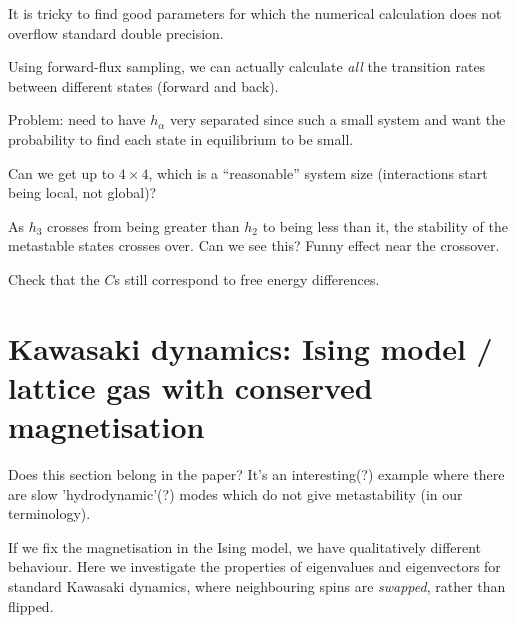 \documentclass[10pt]{article}
\newcommand{\zeros}{\mathbf{0}}
\newcommand{\comment}[1]{{\color{red}#1}}
\begin{document}

It is tricky to find good parameters for which the numerical calculation does
not overflow standard double precision.

Using forward-flux sampling, we can actually calculate \emph{all} the transition
rates
between different states (forward and back).

Problem: need to have $h_\alpha$ very separated since such a small system and
want the probability to find each state in equilibrium to be small.

Can we get up to $4 \times 4$, which is a ``reasonable''
system size (interactions start being local, not global)?

As $h_3$ crosses from being greater than $h_2$ to being less than it, the
stability of the metastable states crosses over.  Can we see this?  Funny
effect near the crossover.


Check that the $C$s still correspond to free energy differences.

% 
% 

\section{Kawasaki dynamics: Ising model / lattice gas with conserved
magnetisation}

\comment{Does this section belong in the paper?  It's an interesting(?) example
where there are slow 'hydrodynamic'(?) modes which do not give metastability (in our terminology).
}



If we fix the magnetisation in the Ising model, we have qualitatively different
behaviour.  Here we investigate the properties of eigenvalues and eigenvectors
for standard Kawasaki dynamics, where neighbouring spins are \emph{swapped},
rather than flipped.
\end{document}
